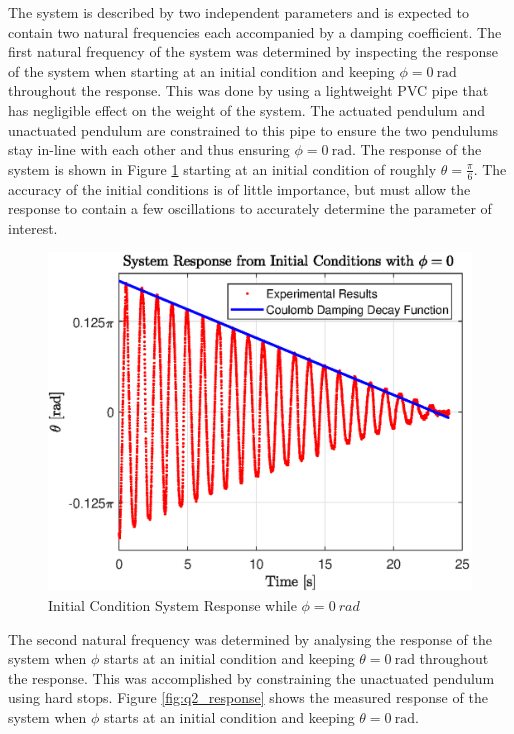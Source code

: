 The system is described by two independent parameters and is expected to contain two natural frequencies each accompanied by a damping coefficient. The first natural frequency of the system was determined by inspecting the response of the system when starting at an initial condition and keeping $\phi = \SI{0}{\radian}$ throughout the response. This was done by using a lightweight PVC pipe that has negligible effect on the weight of the system. The actuated pendulum and unactuated pendulum are constrained to this pipe to ensure the two pendulums stay in-line with each other and thus ensuring $\phi = \SI{0}{\radian}$. The response of the system is shown in Figure \ref{fig:q1_response} starting at an initial condition of roughly $\theta = \frac{\pi}{6}$. The accuracy of the initial conditions is of little importance, but must allow the response to contain a few oscillations to accurately determine the parameter of interest.\\

\begin{figure}[h]
	\centering
	\includegraphics[scale=1]{./figs/q1_initial_response.eps}
	\caption{Initial Condition System Response while $ \phi = \SI{0}{rad} $ }
	\label{fig:q1_response}
\end{figure}


The second natural frequency was determined by analysing the response of the system when $\phi$ starts at an initial condition and keeping $\theta = \SI{0}{\radian}$ throughout the response. This was accomplished by constraining the unactuated pendulum using hard stops. Figure \ref{fig:q2_response} shows the measured response of the system when $\phi$ starts at an initial condition and keeping $\theta = \SI{0}{\radian} $.\\

